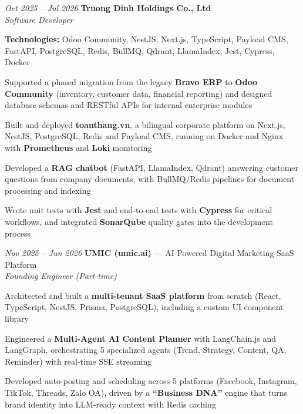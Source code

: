 \begin{twocolentry}{\textit{Oct 2025 -- Jul 2026}}
    \textbf{Truong Dinh Holdings Co., Ltd} \\[4pt]
    \textit{Software Developer}
\end{twocolentry}
\begin{onecolentry}
    \begin{highlights}
        \item \textbf{Technologies:} Odoo Community, NestJS, Next.js, TypeScript, Payload CMS, FastAPI, PostgreSQL, Redis, BullMQ, Qdrant, LlamaIndex, Jest, Cypress, Docker
        \item Supported a phased migration from the legacy \textbf{Bravo ERP} to \textbf{Odoo Community} (inventory, customer data, financial reporting) and designed database schemas and RESTful APIs for internal enterprise modules
        \item Built and deployed \textbf{toanthang.vn}, a bilingual corporate platform on Next.js, NestJS, PostgreSQL, Redis and Payload CMS, running on Docker and Nginx with \textbf{Prometheus} and \textbf{Loki} monitoring
        \item Developed a \textbf{RAG chatbot} (FastAPI, LlamaIndex, Qdrant) answering customer questions from company documents, with BullMQ/Redis pipelines for document processing and indexing
        \item Wrote unit tests with \textbf{Jest} and end-to-end tests with \textbf{Cypress} for critical workflows, and integrated \textbf{SonarQube} quality gates into the development process
    \end{highlights}
\end{onecolentry}
\vspace{0.2 cm}

\begin{twocolentry}{\textit{Nov 2025 -- Jun 2026}}
    \textbf{UMIC (umic.ai)} --- AI-Powered Digital Marketing SaaS Platform \\[4pt]
    \textit{Founding Engineer (Part-time)}
\end{twocolentry}
\begin{onecolentry}
    \begin{highlights}
        \item Architected and built a \textbf{multi-tenant SaaS platform} from scratch (React, TypeScript, NestJS, Prisma, PostgreSQL), including a custom UI component library
        \item Engineered a \textbf{Multi-Agent AI Content Planner} with LangChain.js and LangGraph, orchestrating 5 specialized agents (Trend, Strategy, Content, QA, Reminder) with real-time SSE streaming
        \item Developed auto-posting and scheduling across 5 platforms (Facebook, Instagram, TikTok, Threads, Zalo OA), driven by a \textbf{``Business DNA''} engine that turns brand identity into LLM-ready context with Redis caching
    \end{highlights}
\end{onecolentry}
\vspace{0.2 cm}

